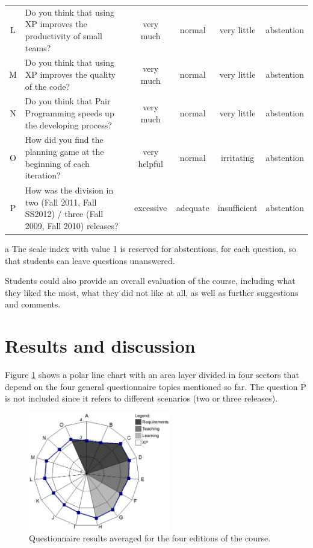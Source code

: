 \documentclass[conference]{IEEEtran}
\begin{document}
\begin{table}[!t]
\begin{threeparttable}
\begin{tabular}{|c|l||cccc|}
    L & Do you think that using XP improves the productivity of small teams? & very much & normal & very little & abstention\\
    M & Do you think that using XP improves the quality of the code? & very much & normal & very little & abstention\\
    N & Do you think that Pair Programming speeds up the developing process? & very much & normal & very little & abstention\\
    O & How did you find the planning game at the beginning of each iteration? & very helpful & normal & irritating & abstention\\
    \hdashline
    P & How was the division in two (Fall 2011, Fall SS2012) / three (Fall 2009, Fall 2010) releases? & excessive & adequate & insufficient & abstention\\
\hline
\end{tabular}
\begin{tablenotes}
  \item[a] The scale index with value 1 is reserved for abstentions, for each question, so that students can leave questions unanswered.
\end{tablenotes}
\end{threeparttable}
\end{table}

Students could also provide an overall evaluation of the course, including what they liked the most, what they did not like at all, as well as further suggestions and comments.


\section{Results and discussion}
\label{sec:results}

Figure \ref{fig:polargraph} shows a polar line chart with an area layer divided in four sectors that depend on the four general questionnaire topics mentioned so far. The question P is not included since it refers to different scenarios (two or three releases).

\begin{figure}[!t]
\centering
\includegraphics[width=6.2cm]{Resources/webgraph.pdf}
\caption{Questionnaire results averaged for the four editions of the course.}
\label{fig:polargraph}
\end{figure}
\end{document}
